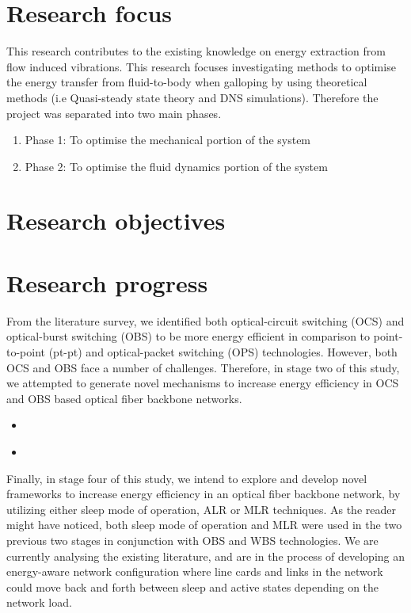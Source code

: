\documentclass{article}
\begin{document}
\section{Research focus}
 This research contributes to the existing knowledge on energy extraction from flow induced vibrations. This research focuses investigating methods to optimise the energy transfer from fluid-to-body when galloping by using theoretical methods (i.e Quasi-steady state theory and DNS simulations). Therefore the project was separated into two main phases.
 
\begin{enumerate}[]
\item Phase 1: To optimise the mechanical portion of the system 
\item Phase 2: To optimise the fluid dynamics portion of the system 
\end{enumerate}










\section{Research objectives}










\section{Research progress}

From the literature survey, we identified both optical-circuit switching (OCS) and optical-burst switching (OBS) to be more energy efficient in comparison to point-to-point (pt-pt) and optical-packet switching (OPS) technologies. However, both OCS and OBS face a number of challenges. Therefore, in stage two of this study, we attempted to generate novel mechanisms to increase energy efficiency in OCS and OBS based optical fiber backbone networks. 
\begin{itemize}
\item 
\end{itemize}


\begin{itemize}
\item 

\end{itemize}
Finally, in stage four of this study, we intend to explore and develop novel frameworks to increase energy efficiency in an optical fiber backbone network, by utilizing either sleep mode of operation, ALR or MLR techniques. As the reader might have noticed, both sleep mode of operation and MLR were used in the two previous two stages in conjunction with OBS and WBS technologies. We are currently analysing the existing literature, and are in the process of developing an energy-aware network configuration where line cards and links in the network could move back and forth between sleep and active states depending on the network load. 
\end{document}
